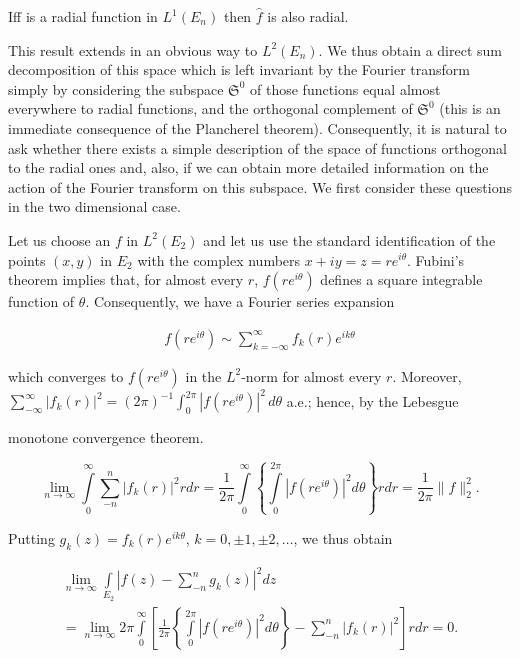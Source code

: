 \begin{corollary}
\label{cor:c4-1-2}
Iff is a radial function in $L^{1}(E_{n})$ then $\hat{f}$ is also radial.
\end{corollary}

This result extends in an obvious way to $L^2(E_n)$. We thus obtain a direct sum decomposition of this space which is left invariant by the Fourier transform simply by considering the subspace $\mathfrak{S}^0$ of those functions equal almost everywhere to radial functions, and the orthogonal complement of $\mathfrak{S}^0$ (this is an immediate consequence of the Plancherel theorem). Consequently, it is natural to ask whether there exists a simple description of the space of functions orthogonal to the radial ones and, also, if we can obtain more detailed information on the action of the Fourier transform on this subspace. We first consider these questions in the two dimensional case.

Let us choose an $f$ in $L^2(E_2)$ and let us use the standard identification of the points $(x, y)$ in $E_2$ with the complex numbers $x + iy = z = re^{i\theta}$. Fubini's theorem implies that, for almost every $r$, $f(re^{i\theta})$ defines a square integrable function of $\theta$. Consequently, we have a Fourier series expansion

\begin{equation}\label{eq:c4-1-3}
\begin{array}{c} f(re^{i\theta}) \sim \displaystyle \sum_{k = - \infty}^{\infty} f_{k}(r)e^{ik\theta} \end{array}
\end{equation}

which converges to $f(re^{i\theta})$ in the $L^2$-norm for almost every $r$. Moreover, $\sum_{-\infty}^{\infty}|f_k(r)|^2 = (2\pi)^{-1}\int_0^{2\pi}|f(re^{i\theta})|^2\,d\theta$ a.e.; hence, by the Lebesgue

monotone convergence theorem.

\[
\lim_{n\to\infty}\int\limits_{0}^{\infty}\sum_{-n}^{n}|f_{k}(r)|^{2}r dr=\frac{1}{2\pi}\int\limits_{0}^{\infty}\left\{\int\limits_{0}^{2\pi}|f(re^{i\theta})|^{2}d\theta\right\}r dr=\frac{1}{2\pi}\|f\|_{2}^{2}.
\]

Putting $g_k(z) = f_k(r)e^{ik\theta}$, $k = 0, \pm1, \pm2, \ldots$, we thus obtain

\[
\begin{aligned}\lim_{n\to\infty}\int\limits_{E_{2}}|f(z)-\sum_{-n}^{n}g_{k}(z)|^{2}dz\\=\lim_{n\to\infty}2\pi\int\limits_{0}^{\infty}\left[\frac{1}{2\pi}\left\{\int\limits_{0}^{2\pi}|f(re^{i\theta})|^{2}d\theta\right\}-\sum_{-n}^{n}|f_{k}(r)|^{2}\right]r dr=0.\end{aligned}
\]


